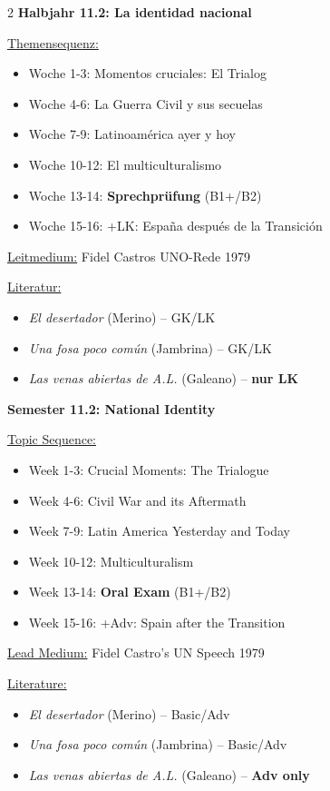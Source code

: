 \documentclass[10pt,a4paper]{article}
\newcommand{\bil}[2]{%
\begin{paracol}{2}
\small #1
\switchcolumn
\small\textcolor{english}{#2}
\end{paracol}
}
\begin{document}
\vspace{3mm}

\bil{%
\textbf{Halbjahr 11.2: La identidad nacional}

\underline{Themensequenz:}
\begin{itemize}[noitemsep,topsep=2pt]
\item Woche 1-3: Momentos cruciales: El Trialog
\item Woche 4-6: La Guerra Civil y sus secuelas
\item Woche 7-9: Latinoamérica ayer y hoy
\item Woche 10-12: El multiculturalismo
\item Woche 13-14: \textbf{Sprechprüfung} (B1+/B2)
\item Woche 15-16: +LK: España después de la Transición
\end{itemize}

\underline{Leitmedium:} Fidel Castros UNO-Rede 1979

\underline{Literatur:}
\begin{itemize}[noitemsep,topsep=2pt]
\item \textit{El desertador} (Merino) -- GK/LK
\item \textit{Una fosa poco común} (Jambrina) -- GK/LK
\item \textit{Las venas abiertas de A.L.} (Galeano) -- \textbf{nur LK}
\end{itemize}
}{%
\textbf{Semester 11.2: National Identity}

\underline{Topic Sequence:}
\begin{itemize}[noitemsep,topsep=2pt]
\item Week 1-3: Crucial Moments: The Trialogue
\item Week 4-6: Civil War and its Aftermath
\item Week 7-9: Latin America Yesterday and Today
\item Week 10-12: Multiculturalism
\item Week 13-14: \textbf{Oral Exam} (B1+/B2)
\item Week 15-16: +Adv: Spain after the Transition
\end{itemize}

\underline{Lead Medium:} Fidel Castro's UN Speech 1979

\underline{Literature:}
\begin{itemize}[noitemsep,topsep=2pt]
\item \textit{El desertador} (Merino) -- Basic/Adv
\item \textit{Una fosa poco común} (Jambrina) -- Basic/Adv
\item \textit{Las venas abiertas de A.L.} (Galeano) -- \textbf{Adv only}
\end{itemize}
}
\end{document}
